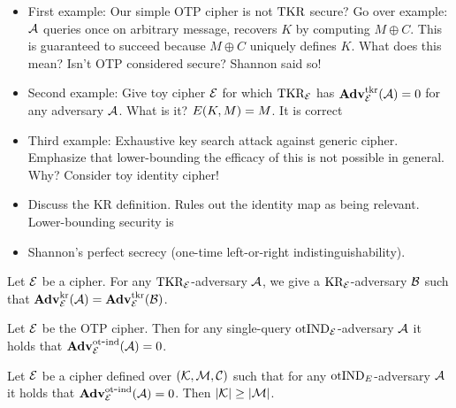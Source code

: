 \bigskip
\bigskip


\begin{itemize}
\item First example: Our simple OTP cipher is not $\textnormal{TKR}$ secure? Go over example: ${\mathcal A}$
queries once on arbitrary message, recovers $K$ by computing $M \oplus C$. This
is guaranteed to succeed because $M \oplus C$ uniquely defines $K$. What does
this mean? Isn't OTP considered secure? Shannon said so!
%
\item Second example: Give toy cipher ${\cal E}$ for which $\textnormal{TKR}_{\cal E}$ has
$\mathbf{Adv}^{\mathrm{tkr}}_{{\cal E}}({\mathcal A}) = 0$ for any adversary ${\mathcal A}$. What is it?
$E(K,M) = M$. It is correct 
%
\item Third example: Exhaustive key search attack against generic
cipher. Emphasize that lower-bounding the efficacy of this is not possible in
general. Why? Consider toy identity cipher! 
%
\item Discuss the KR definition. Rules out the
identity map as being relevant. Lower-bounding security is 
%
\item Shannon's perfect secrecy (one-time left-or-right indistinguishability). 
\end{itemize}

\begin{theorem}
Let ${\cal E}$ be a cipher. For any $\textnormal{TKR}_{\cal E}$-adversary ${\mathcal A}$, we give a
$\textnormal{KR}_{\cal E}$-adversary ${\mathcal B}$ such that 
  $\mathbf{Adv}^{\mathrm{kr}}_{{\cal E}}({\mathcal A}) = \mathbf{Adv}^{\mathrm{tkr}}_{{\cal E}}({\mathcal B})$.
\end{theorem}



\begin{theorem}
Let ${\cal E}$ be the OTP cipher. Then for any single-query
$\textnormal{otIND}_{\cal E}$-adversary ${\mathcal A}$ it holds that $\mathbf{Adv}^{\mathrm{ot\mbox{-} ind}}_{{\cal E}}({\mathcal A}) = 0$. \end{theorem}


\begin{theorem}
Let ${\cal E}$ be a cipher defined 
over $({\cal K},{\cal M},{\cal C})$ such that for any $\textnormal{otIND}_E$-adversary 
${\mathcal A}$ it holds that $\mathbf{Adv}^{\mathrm{ot\mbox{-} ind}}_{{\cal E}}({\mathcal A}) = 0$. Then $|{\cal K}| \ge
|{\cal M}|$. 
\end{theorem}

